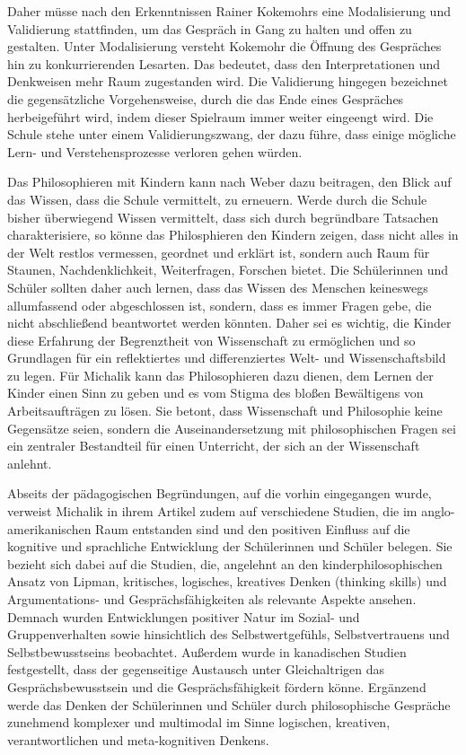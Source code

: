 Daher müsse nach den Erkenntnissen Rainer Kokemohrs eine Modalisierung und Validierung stattfinden, um das Gespräch in Gang zu halten und offen zu gestalten.
Unter Modalisierung versteht Kokemohr \glqq die Öffnung des Gespräches hin zu konkurrierenden Lesarten.\grqq{}\cite{KM13, 637}
Das bedeutet, dass den Interpretationen und Denkweisen mehr Raum zugestanden wird.
Die Validierung hingegen bezeichnet die gegensätzliche Vorgehensweise, durch die das Ende eines Gespräches herbeigeführt wird, indem dieser Spielraum immer weiter eingeengt wird.
Die Schule stehe unter einem Validierungszwang, der dazu führe, dass einige mögliche Lern- und Verstehensprozesse verloren gehen würden.
 
Das Philosophieren mit Kindern kann nach Weber dazu beitragen, den Blick auf das Wissen, dass die Schule vermittelt, zu erneuern.
Werde durch die Schule bisher überwiegend Wissen vermittelt, dass sich durch begründbare Tatsachen charakterisiere, so könne das Philosphieren den Kindern zeigen, dass nicht alles in der Welt \glqq restlos vermessen, geordnet und erklärt ist, sondern auch Raum für Staunen, Nachdenklichkeit, Weiterfragen, Forschen bietet.\grqq{}\cite{KM13, S.639}
Die Schülerinnen und Schüler sollten daher auch lernen, dass das Wissen des Menschen keineswegs allumfassend oder abgeschlossen ist, sondern, dass es immer Fragen gebe, die nicht abschließend beantwortet werden könnten.
Daher sei es wichtig, die Kinder diese Erfahrung der Begrenztheit von Wissenschaft zu ermöglichen und so \glqq Grundlagen für ein reflektiertes und differenziertes Welt- und Wissenschaftsbild zu legen.\grqq{}\cite{KM13, S.640}
Für Michalik kann das Philosophieren dazu dienen, dem Lernen der Kinder einen Sinn zu geben und es vom Stigma des bloßen Bewältigens von Arbeitsaufträgen zu lösen.
Sie betont, dass Wissenschaft und Philosophie keine Gegensätze seien, sondern die Auseinandersetzung mit philosophischen Fragen sei ein zentraler Bestandteil für einen Unterricht, der sich an der Wissenschaft anlehnt.
  
Abseits der pädagogischen Begründungen, auf die vorhin eingegangen wurde, verweist Michalik in ihrem Artikel zudem auf verschiedene Studien, die im anglo-amerikanischen Raum entstanden sind und den positiven Einfluss auf die kognitive und sprachliche Entwicklung der Schülerinnen und Schüler belegen. 
Sie bezieht sich dabei auf die Studien, die, angelehnt an den kinderphilosophischen Ansatz von Lipman, \glqq kritisches, logisches, kreatives Denken (thinking skills) und Argumentations- und Gesprächsfähigkeiten\grqq{}\cite{KM13, S.643} als relevante Aspekte ansehen. 
Demnach wurden Entwicklungen positiver Natur im Sozial- und Gruppenverhalten sowie hinsichtlich des Selbstwertgefühls, Selbstvertrauens und Selbstbewusstseins beobachtet.
Außerdem wurde in kanadischen Studien festgestellt, dass der gegenseitige Austausch unter Gleichaltrigen das Gesprächsbewusstsein und die Gesprächsfähigkeit fördern könne. 
Ergänzend werde das Denken der Schülerinnen und Schüler durch philosophische Gespräche \glqq zunehmend komplexer und multimodal im Sinne logischen, kreativen, verantwortlichen und meta-kognitiven Denkens.

